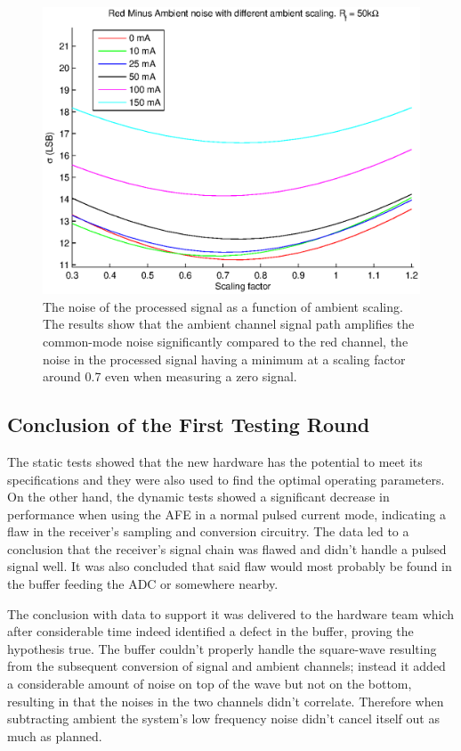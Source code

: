 \begin{figure}[htcb!]
\begin{center}
  \includegraphics{kuvat/measurements/noise_vs_ambient_scaling.eps}
  \caption{The noise of the processed signal as a function of ambient scaling. The results show that the ambient channel signal path amplifies the common-mode noise significantly compared to the red channel, the noise in the processed signal having a minimum at a scaling factor around 0.7 even when measuring a zero signal.}
  \label{fig:noise_vs_ambient_scaling}
\end{center}
\end{figure}

\subsection{Conclusion of the First Testing Round}\label{section:analysis_conclusion}

The static tests showed that the new hardware has the potential to meet its specifications and they were also used to find the optimal operating parameters. On the other hand, the dynamic tests showed a significant decrease in performance when using the AFE in a normal pulsed current mode, indicating a flaw in the receiver's sampling and conversion circuitry. The data led to a conclusion that the receiver's signal chain was flawed and didn't handle a pulsed signal well. It was also concluded that said flaw would most probably be found in the buffer feeding the ADC or somewhere nearby.

The conclusion with data to support it was delivered to the hardware team which after considerable time indeed identified a defect in the buffer, proving the hypothesis true. The buffer couldn't properly handle the square-wave resulting from the subsequent conversion of signal and ambient channels; instead it added a considerable amount of noise on top of the wave but not on the bottom, resulting in that the noises in the two channels didn't correlate. Therefore when subtracting ambient the system's low frequency noise didn't cancel itself out as much as planned.

